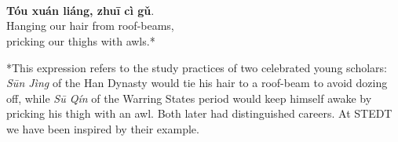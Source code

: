 \onecolumn
\section*{}

\hfill
\hfill
\begin{minipage}[c]{0.3\linewidth}
\\
\textbf{Tóu xuán liáng, zhuī cì gǔ}.\\
Hanging our hair from roof-beams,\\
pricking our thighs with awls.*
\end{minipage}
\hfill
\hfill

\bigskip

\bigskip

\bigskip

\bigskip

\hfill
\begin{minipage}[c]{0.3\linewidth}
*This expression refers to the study practices of two celebrated young scholars: \textit{Sūn Jìng}  of the Han Dynasty would tie his hair to a roof-beam to avoid dozing off, while \textit{Sū Qín}  of the Warring States period would keep himself awake by pricking his thigh with an awl. Both later had distinguished careers. At STEDT we have been inspired by their example.
\end{minipage}
\hfill
\hfill

\twocolumn
